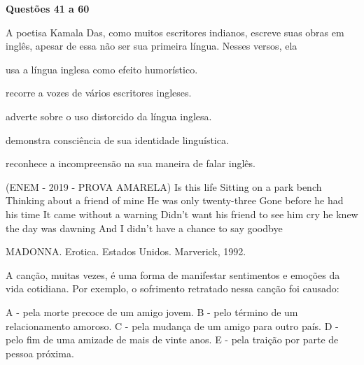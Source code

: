 
\noindent\textbf{Questões 41 a 60} %

A poetisa Kamala Das, como muitos escritores indianos, escreve suas obras em inglês, apesar de essa não ser sua primeira língua. Nesses versos, ela
\begin{alternativas}
\item usa a língua inglesa como efeito humorístico.
\item recorre a vozes de vários escritores ingleses.
\item adverte sobre o uso distorcido da língua inglesa.
\item demonstra consciência de sua identidade linguística.
\item reconhece a incompreensão na sua maneira de falar inglês.
\end{alternativas}

(ENEM - 2019 - PROVA AMARELA)
Is this life
Sitting on a park bench
Thinking about a friend of mine
He was only twenty-three
Gone before he had his time
It came without a warning
Didn’t want his friend to see him cry
he knew the day was dawning
And I didn’t have a chance to say goodbye

MADONNA. Erotica. Estados Unidos. Marverick, 1992.

A canção, muitas vezes, é uma forma de manifestar sentimentos e emoções da vida cotidiana. Por exemplo, o sofrimento retratado nessa canção foi causado:

A - pela morte precoce de um amigo jovem.
B - pelo término de um relacionamento amoroso.
C - pela mudança de um amigo para outro país.
D - pelo fim de uma amizade de mais de vinte anos.
E - pela traição por parte de pessoa próxima.
